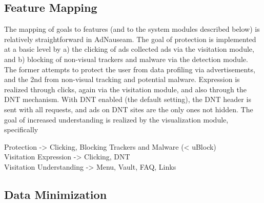 \documentclass[conference]{IEEEtran}
\begin{document}
\subsection{Feature Mapping}

The mapping of goals to features (and to the system modules described below) is relatively straightforward in AdNauseam. The goal of protection is implemented at a basic level by a) the clicking of ads collected ads via the visitation module, and b) blocking of non-visual trackers and malware via the detection module. The former attempts to protect the user from data profiling via advertisements, and the 2nd from non-visual tracking and potential malware. Expression is realized through clicks, again via the visitation module, and also through the DNT mechanism. With DNT enabled (the default setting), the DNT header is sent with all requests, and ads on DNT sites are the only ones not hidden. The goal of increased understanding is realized by the visualization module, specifically

Protection -> Clicking, Blocking Trackers and Malware (< uBlock)\\ Visitation
Expression -> Clicking, DNT\\  Visitation
Understanding -> Menu, Vault, FAQ, Links\\

\subsection{Data Minimization}
\end{document}
